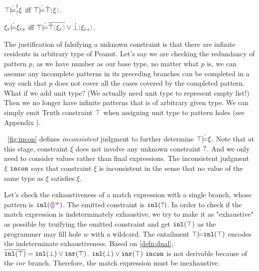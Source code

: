 \begin{theorem}
\label{theorem:exhaustive-truify}
  $\top \dot{\models}_{?}^{\dag} \xi$ iff $\csatisfy{\ctruth}{\ctruify{\xi}}$.
\end{theorem}

\begin{theorem}
\label{theorem:redundant-truify-falsify}
  $\xi_r \dot{\models} \xi_{rs}$ iff $\csatisfy{\ctruth}{\cor{\cdual{\ctruify{\xi_r}}}{\cfalsify{\xi_{rs}}}}$.
\end{theorem}

The justification of falsifying a unknown constraint is that there are infinite residents in arbitrary type of Peanut. Let's say we are checking the redundancy of pattern $p$, as we have number as our base type, no matter what $p$ is, we can assume any incomplete patterns in its preceding branches can be completed in a way such that $p$ does not cover all the cases covered by the completed pattern.
What if we add unit type? (We actually need unit type to represent empty list!) Then we no longer have infinite patterns that is of arbitrary given type. We can simply emit Truth constraint $\top$ when assigning unit type to pattern holes (see Appendix \todo{}).

\figurename~\ref{fig:incon} defines \textit{inconsistent} judgment to further determine $\top \dot{\models} \xi$. Note that at this stage, constraint $\xi$ does not involve any unknown constraint $\mathtt{?}$. And we only need to consider values rather than final expressions. The inconsistent judgment $\xi ~\mathtt{incon}$ says that constraint $\xi$ is inconsistent in the sense that no value of the same type as $\xi$ satisfies $\xi$.



Let's check the exhaustiveness of a match expression with a single branch, whose pattern is $\mathtt{inl}(\textcolor{violet}{\llparenthesis}\textcolor{violet}{\rrparenthesis}^{w})$. The emitted constraint is $\mathtt{inl}(\mathtt{?})$. 
In order to check if the match expression is indeterminately exhaustive, we try to make it as "exhaustive" as possible by truifying the emitted constraint and get $\mathtt{inl}(\top)$ as the programmer may fill hole $w$ with a wildcard.
The entailment $\top \dot{\models} \mathtt{inl}(\top)$ encodes the indeterminate exhaustiveness. 
Based on \autoref{defn:dual}, $\overline{\mathtt{inl}(\top)}=\mathtt{inl}(\bot) \vee \mathtt{inr}(\top)$.
$\mathtt{inl}(\bot) \vee \mathtt{inr}(\top) ~\mathtt{incon}$ is not derivable because of the $inr$ branch. Therefore, the match expression must be inexhaustive.



